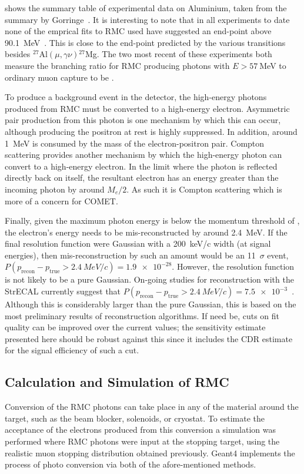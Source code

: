 \FigRMCExperiments

 shows the summary table of experimental data on Aluminium, taken from the summary by Gorringe~\cite{RevModPhys.76.31}.
It is interesting to note that in all experiments to date none of the emprical fits to RMC used have suggested an end-point above 90.1~MeV~\cite{PhysRevC.37.1633,PhysRevC.46.1094,PhysRevC.59.2853}.
This is close to the end-point predicted by the various transitions besides ${}^{27}$Al$(\mu,\gamma\nu){}^{27}$Mg.
The two most recent of these experiments both measure the branching ratio for \ac{RMC} producing photons with $E>57~$MeV to ordinary muon capture to be . 

To produce a background event in the detector, the high-energy photons produced from RMC must be converted to a high-energy electron.
Asymmetric pair production from this photon is one mechanism by which this can occur, although producing the positron at rest is highly suppressed.
In addition, around 1~MeV is consumed by the mass of the electron-positron pair.
Compton scattering provides another mechanism by which the high-energy photon can convert to a high-energy electron.
In the limit where the photon is reflected directly back on itself, the resultant electron has an energy greater than the incoming photon by around $M_e/2$.
As such it is Compton scattering which is more of a concern for COMET.

Finally, given the maximum photon energy is below the momentum threshold of \VarMomThreshold, the electron's energy needs to be mis-reconstructed by around 2.4~MeV.
If the final resolution function were Gaussian with a 200~keV/c width (at signal energies), then mis-reconstruction by such an amount would be an 11~$\sigma$ event, \ie $P(p_\textrm{recon}-p_\textrm{true}>\SI{2.4}{MeV/c})=\num{1.9e-28}$.
However, the resolution function is not likely to be a pure Gaussian.
On-going studies for reconstruction with the  \phaseI StrECAL currently suggest that $P(p_\textrm{recon}-p_\textrm{true}>\SI{2.4}{MeV/c})=\num{7.5e-3}$~\cite{YFujiiStrECALRecon}.
Although this is considerably larger than the pure Gaussian, this is based on the most preliminary results of reconstruction algorithms.
If need be, cuts on fit quality can be improved over the current \phaseI values; the sensitivity estimate presented here should be robust against this since it includes the CDR estimate for the signal efficiency of such a cut.

\subsection{Calculation and Simulation of RMC}
Conversion of the RMC photons can take place in any of the material around the target, such as the beam blocker, solenoids, or cryostat.
To estimate the acceptance of the electrons produced from this conversion a simulation was performed where RMC photons were input at the stopping target, using the realistic muon stopping distribution obtained previously.
Geant4 implements the process of photo conversion via both of the afore-mentioned methods.

